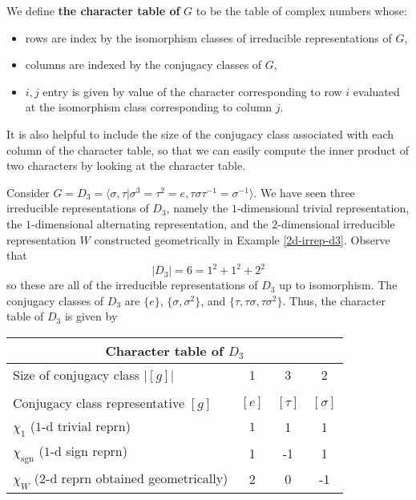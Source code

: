 \begin{defn}
We define \textbf{the character table of } $G$ to be the table of complex numbers whose:
\begin{itemize}\item rows are index by the isomorphism classes of irreducible representations of $G$, 
\item columns are indexed by the conjugacy classes of $G$,
\item $i,j$ entry is given by value of the character corresponding to row $i$ evaluated at the isomorphism class corresponding to column $j$.
\end{itemize}
\end{defn}
\begin{note}
It is also helpful to include the size of the conjugacy class associated with each column of the character table, so that we can easily compute the inner product of two characters by looking at the character table.
\end{note}

\begin{example}
Consider $G=D_3 = \langle \sigma, \tau | \sigma^3 = \tau^2 = e, \tau \sigma \tau^{-1} = \sigma^{-1} \rangle$.  We have seen three irreducible representations of $D_3$, namely the $1$-dimensional trivial representation, the $1$-dimensional alternating representation, and the $2$-dimensional irreducible representation $W$ constructed geometrically in Example \ref{2d-irrep-d3}.  Observe that
\[ |D_3| = 6 = 1^2 + 1^2 +2^2 \]
so these are all of the irreducible representations of $D_3$ up to isomorphism.  The conjugacy classes of $D_3$ are 
$\{e\}$, $\{ \sigma, \sigma ^2 \}$, and $\{\tau, \tau \sigma, \tau \sigma^2 \}$.  Thus, the character table of $D_3$ is given by 

\begin{tabular}{ | l | c | c | c |}\hline 
\multicolumn{4}{|c|}{Character table of $D_3$} \\ \hline
Size of conjugacy class $\vert [ g] \vert$ & 1 & 3 & 2 \\ \hline
\multicolumn{4}{|c|}{} \\ \hline

Conjugacy class representative $[g]$ & $[e]$ & $[\tau]$ & $[\sigma]$ \\ \hline
$\chi_1$  ($1$-d trivial reprn) & $1$ & 1 & 1 \\ \hline
$\chi_{\text{sgn}}$  ($1$-d sign reprn)  & 1 & -1 & 1 \\ \hline
$\chi_W$ ($2$-d reprn obtained geometrically) & 2 & 0 & -1 \\
\hline
\end{tabular}
\end{example}



